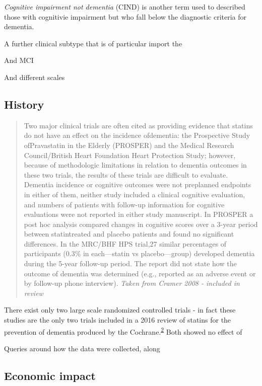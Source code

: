 \documentclass[a4paper, twoside]{templates/ociamthesis}
\begin{document}
\emph{Cognitive impairment not dementia} (CIND) is another term used to described those with cognitivie impairment but who fall below the diagnostic criteria for dementia.

A further clinical subtype that is of particular import the

And MCI

And different scales

\hypertarget{history}{%
\subsection{History}\label{history}}

\begin{quote}
Two major clinical trials are often cited as providing evidence that statins do not have an effect on the incidence ofdementia: the Prospective Study ofPravastatin in the Elderly (PROSPER) and the Medical Research
Council/British Heart Foundation Heart Protection Study; however, because of methodologic limitations in relation to dementia outcomes in these two trials, the results of these trials are difficult to evaluate. Dementia incidence or cognitive outcomes were not preplanned endpoints in either of them, neither study included a clinical cognitive evaluation, and numbers of patients with follow-up information for cognitive evaluations were not reported in either study manuscript. In PROSPER a post hoc analysis compared changes in cognitive scores over a 3-year period between statintreated and placebo patients and found no significant differences. In the MRC/BHF HPS trial,27
similar percentages of participants (0.3\% in each---statin vs placebo---group) developed dementia during the 5-year follow-up period. The report did not state how the outcome of dementia was determined (e.g., reported as an adverse event or by follow-up phone interview).
\emph{Taken from Cramer 2008 - included in review}
\end{quote}

There exist only two large scale randomized controlled trials - in fact these studies are the only two trials included in a 2016 review of statins for the prevention of dementia produced by the Cochrane.\textsuperscript{\protect\hyperlink{ref-mcguinness2016b}{2}} Both showed no effect of

Queries around how the data were collected, along

\hypertarget{economic-impact}{%
\subsection{Economic impact}\label{economic-impact}}
\end{document}
